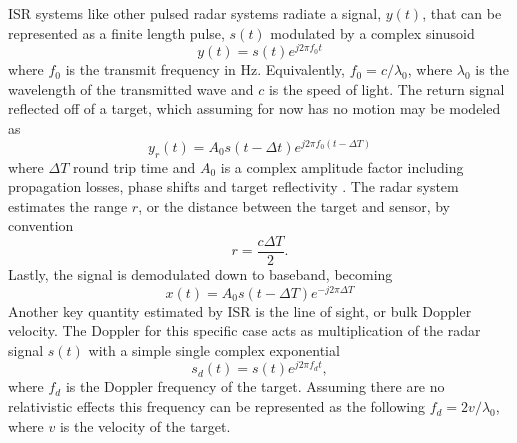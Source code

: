 ISR systems like other pulsed radar systems radiate a signal, $y(t)$, that can be represented as a finite length pulse, $s(t)$ modulated by a complex sinusoid
\begin{equation}
\label{eqn:sigone}
y(t)=s(t)e^{j2\pi f_0 t}
\end{equation}
where $f_0$ is the transmit frequency in Hz. Equivalently, $ f_0=c/\lambda_0$, where $\lambda_0$ is the wavelength of the transmitted wave and $c$ is the speed of light. The return signal reflected off of a target, which assuming for now has no motion may be modeled as
\begin{equation}
\label{eqn:sigone}
y_r(t)=A_0s(t-\Delta t)e^{j2\pi f_0 (t-\Delta T)}
\end{equation}
where $\Delta T$ round trip time and $A_0$ is a complex amplitude factor including propagation losses, phase shifts and target reflectivity \cite{richards2014fundamentals}. The radar system estimates the range $r$, or the distance between the target and sensor, by convention
\begin{equation}
\label{eqn:range_intro}
r=\frac{c\Delta T}{2}.
\end{equation}
Lastly, the signal is demodulated down to baseband, becoming
\begin{equation}
\label{eqn:baseband}
x(t)=A_0s(t-\Delta T)e^{-j2\pi\Delta T}
\end{equation}
Another key quantity estimated by ISR is the line of sight, or bulk Doppler velocity. The Doppler for this specific case acts as multiplication of the radar signal $s(t)$ with a simple single complex exponential
\begin{equation}
\label{simpledop}
s_d(t) = s(t)e^{j2\pi f_d t},
\end{equation}
 where $f_d$ is the Doppler frequency of the target. Assuming there are no relativistic effects this frequency can be represented as the following $f_d = 2v/\lambda_0 $, where $v$ is the velocity of the target. 

